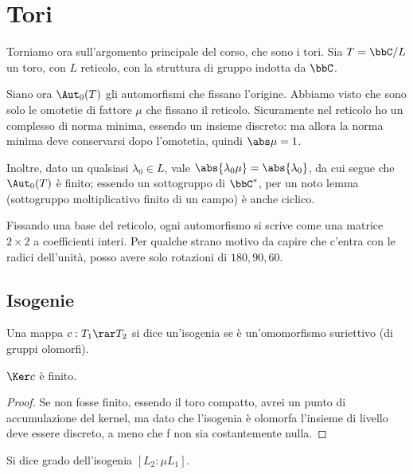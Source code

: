 	
	\section{Tori}
	
	Torniamo ora sull'argomento principale del corso, che sono i tori. Sia $T = \bbC / L$ un toro, con $L$ reticolo, con la struttura di gruppo indotta da $\bbC$.
	
	Siano ora $\Aut_0(T)$ gli automorfismi che fissano l'origine. Abbiamo visto che sono solo le omotetie di fattore $\mu$ che fissano il reticolo. Sicuramente nel reticolo ho un complesso di norma minima, essendo un insieme discreto: ma allora la norma minima deve conservarsi dopo l'omotetia, quindi $\abs \mu=1$.
	
	Inoltre, dato un qualsiasi $\lambda_0 \in L$, vale $\abs{\lambda_0 \mu} = \abs {\lambda_0}$, da cui segue che $\Aut_0(T)$ è finito; essendo un sottogruppo di $\bbC^*$, per un noto lemma (sottogruppo moltiplicativo finito di un campo) è anche ciclico.
	
	Fissando una base del reticolo, ogni automorfismo si scrive come una matrice $2 \times 2$ a coefficienti interi. Per qualche strano motivo da capire che c'entra con le radici dell'unità, %
	posso avere solo rotazioni di $180, 90, 60$.
	
	\subsection{Isogenie}
	\begin{definizione}
		Una mappa $c: T_1 \rar T_2$ si dice un'isogenia se è un'omomorfismo suriettivo (di gruppi olomorfi).
	\end{definizione}
	
	\begin{proposizione}
		$\Ker c$ è finito.
	\end{proposizione}
	\begin{proof}
		Se non fosse finito, essendo il toro compatto, avrei un punto di accumulazione del kernel, ma dato che l'isogenia è olomorfa l'insieme di livello deve essere discreto, a meno che f non sia costantemente nulla.
	\end{proof}
	
	\begin{definizione}
		Si dice grado dell'isogenia $[L_2 : \mu L_1]$.
        \end{definizione}
              
